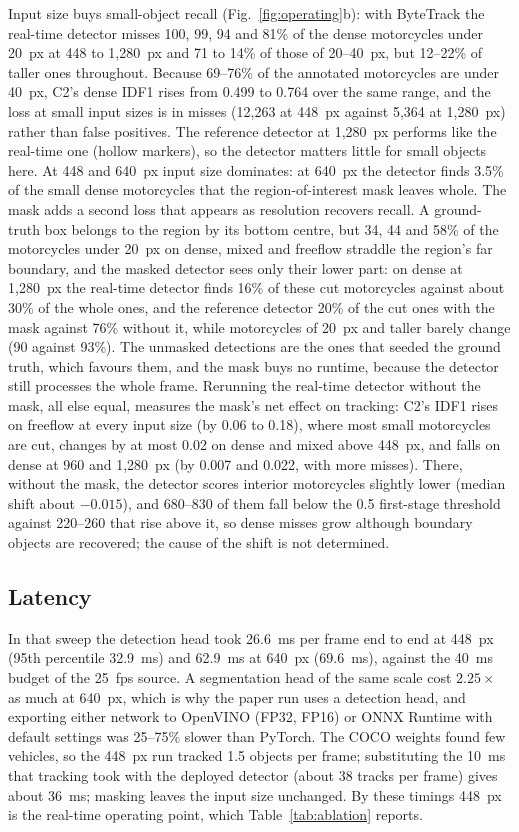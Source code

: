 \documentclass[twocolumn]{svjour3}
\begin{document}
Input size buys small-object recall (Fig.~\ref{fig:operating}b): with
ByteTrack the real-time detector misses 100, 99, 94 and 81\% of the dense
motorcycles under 20~px at 448 to 1,280~px and 71 to 14\% of those of
20--40~px, but 12--22\% of taller ones throughout. Because 69--76\% of the annotated
motorcycles are under 40~px, C2's dense IDF1 rises from 0.499 to 0.764 over the
same range, and the loss at small input sizes is in misses (12,263 at 448~px
against 5,364 at 1,280~px) rather than false positives. The reference detector
at 1,280~px performs like the real-time one (hollow markers), so the detector
matters little for small objects here. At 448 and 640~px input
size dominates: at 640~px the detector finds 3.5\% of the small dense
motorcycles that the region-of-interest mask leaves whole. The mask adds a
second loss that appears as resolution recovers recall. A ground-truth box
belongs to the region by its bottom centre, but 34, 44 and 58\% of the
motorcycles under 20~px on dense, mixed and freeflow straddle the region's far
boundary, and the masked detector sees only their lower part: on dense at
1,280~px the real-time detector finds 16\% of these cut motorcycles against
about 30\% of the whole ones, and the reference detector 20\% of the cut ones
with the mask against 76\% without it, while motorcycles of 20~px and taller
barely change (90 against 93\%). The unmasked
detections are the ones that seeded the ground truth, which favours them, and
the mask buys no runtime, because the detector still processes the whole frame.
Rerunning the real-time detector without the mask, all else equal, measures
the mask's net effect on tracking: C2's IDF1 rises on freeflow at every input
size (by 0.06 to 0.18), where most small motorcycles are cut, changes by at most
0.02 on dense and mixed above 448~px, and falls on dense at 960 and 1,280~px
(by 0.007 and 0.022, with more misses). There, without the mask, the detector
scores interior motorcycles slightly lower (median shift about $-0.015$), and
680--830 of them fall below the 0.5 first-stage threshold against 220--260 that
rise above it, so dense misses grow although boundary objects are recovered;
the cause of the shift is not determined.

\subsection{Latency}\label{subsec:latency}

In that sweep the detection head took 26.6~ms per frame end to end at 448~px
(95th percentile 32.9~ms) and 62.9~ms at 640~px (69.6~ms), against the 40~ms
budget of the 25~fps source. A segmentation head of the same scale cost
$2.25\times$ as much at 640~px, which is why the paper run uses a detection
head, and exporting either network to OpenVINO (FP32, FP16) or ONNX Runtime with
default settings was 25--75\% slower than PyTorch. The COCO weights found few
vehicles, so the 448~px run tracked 1.5 objects per frame; substituting the
10~ms that tracking took with the deployed detector (about 38 tracks per frame)
gives about 36~ms; masking leaves the input size unchanged. By these timings
448~px is the real-time operating point, which Table~\ref{tab:ablation} reports.
\end{document}

